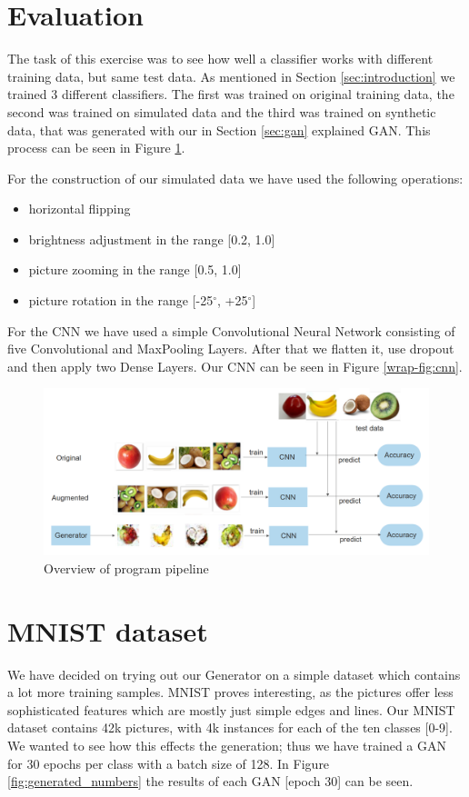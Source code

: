 \documentclass[13pt]{article}
\begin{document}



\section{Evaluation}
The task of this exercise was to see how well a classifier works with different training data, but same test data. 
As mentioned in Section \ref{sec:introduction} we trained 3 different classifiers. The first was trained on original training data, the second was trained on simulated data and the third was trained on synthetic data, that was generated with our in Section \ref{sec:gan} explained GAN. This process can be seen in Figure \ref{fig:cnn_evaluation}.

For the construction of our simulated data we have used the following operations:
\begin{itemize} 
    \item horizontal flipping
    \item brightness adjustment in the range [0.2, 1.0]
    \item picture zooming in the range [0.5, 1.0] 
    \item picture rotation in the range [-25$^{\circ}$, +25$^{\circ}$]
\end{itemize}

For the CNN we have used a simple Convolutional Neural Network consisting of five Convolutional and MaxPooling Layers.
After that we flatten it, use dropout and then apply two Dense Layers. Our CNN can be seen in Figure \ref{wrap-fig:cnn}.

\begin{figure}[h!]
\centering
\centerline{\includegraphics[width=\textwidth]{models/evaluation_CNN_comparison.png}}
\caption{Overview of program pipeline}
\label{fig:cnn_evaluation}
\end{figure}
\newpage
\section{MNIST dataset}
We have decided on trying out our Generator on a simple dataset which contains a lot more training samples.
MNIST proves interesting, as the pictures offer less sophisticated features which are mostly just simple edges and lines.
Our MNIST dataset contains 42k pictures, with 4k instances for each of the ten classes [0-9]. 
We wanted to see how this effects the generation; thus we have trained a GAN for 30 epochs per class with a batch size of 128. 
In Figure \ref{fig:generated_numbers} the results of each GAN [epoch 30] can be seen.
\end{document}
